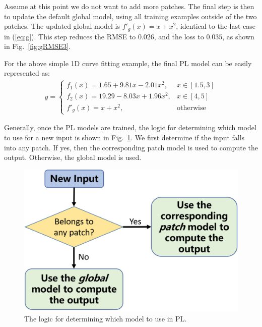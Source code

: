 \documentclass[journal,twocolumn]{IEEEtran}
\begin{document}
Assume at this point we do not want to add more patches. The final step is then to update the default global model, using all training examples outside of the two patches.  The updated global model is $f'_g(x)=x+x^2$, identical to the last case in (\ref{eq:g}). This step reduces the RMSE to $0.026$, and the loss to $0.035$, as shown in Fig.~\ref{fig:gRMSE3}.

For the above simple 1D curve fitting example, the final PL model can be easily represented as:
\begin{align}
y=\left\{\begin{array}{ll}
           f_1(x)=1.65+9.81x-2.01x^2, & x\in[1.5,3] \\
           f_2(x)=19.29-8.03x+1.96x^2, & x\in[4,5] \\
           f'_g(x)=x+x^2, & \mbox{otherwise}
         \end{array}\right. \label{eq:g2}
\end{align}

Generally, once the PL models are trained, the logic for determining which model to use for a new input is shown in Fig.~\ref{fig:PLmodel}. We first determine if the input falls into any patch. If yes, then the corresponding patch model is used to compute the output. Otherwise, the global model is used.

\begin{figure}[htbp]         \centering
\includegraphics[width=.6\linewidth,clip]{Fig4}
\caption{The logic for determining which model to use in PL.} \label{fig:PLmodel}
\end{figure}
\end{document}
